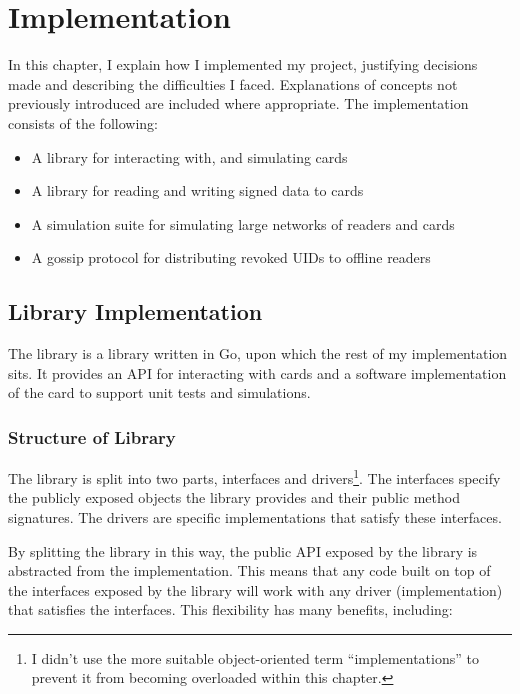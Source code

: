 \documentclass[dissertation.tex]{subfiles}
\begin{document}
  \chapter{Implementation}

  In this chapter, I explain how I implemented my project, justifying decisions made and describing the difficulties I faced. Explanations of \mifare{} concepts not previously introduced are included where appropriate. The implementation consists of the following:
  \begin{itemize}
    \item A library for interacting with, and simulating \mifare{} cards
    \item A library for reading and writing signed data to \mifare{} cards
    \item A simulation suite for simulating large networks of readers and cards
    \item A gossip protocol for distributing revoked UIDs to offline readers
  \end{itemize}

  \section{\mifare{} Library Implementation}

  The \mifare{} library is a library written in Go, upon which the rest of my implementation sits. It provides an API for interacting with \mifare{} cards and a software implementation of the card to support unit tests and simulations.

  \subsection{Structure of Library}
  The library is split into two parts, interfaces and drivers\footnote{I didn't use the more suitable object-oriented term ``implementations'' to prevent it from becoming overloaded within this chapter.}. The interfaces specify the publicly exposed objects the library provides and their public method signatures. The drivers are specific implementations that satisfy these interfaces.

  By splitting the library in this way, the public API exposed by the library is abstracted from the implementation. This means that any code built on top of the interfaces exposed by the library will work with any driver (implementation) that satisfies the interfaces. This flexibility has many benefits, including:
\end{document}
